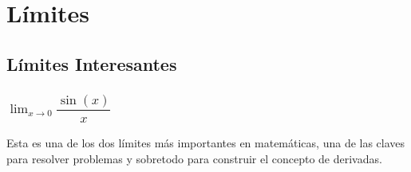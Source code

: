 \documentclass[12pt, fleqn]{report}                             %
\theoremstyle{break}                                            %
\newcommand{\Wrap}[1]           {\left( #1 \right)}             %
\newcommand{\Sin}[1] {\sin\Wrap{#1}}                            %
\begin{document}
    \chapter{Límites}
        \clearpage

        \section{Límites Interesantes}

            \subsection{$\lim_{x \to 0} \dfrac{\Sin{x}}{x}$}

                Esta es una de los dos límites más importantes en matemáticas, una de las claves para 
                resolver problemas y sobretodo para construir el concepto de derivadas.
\end{document}
